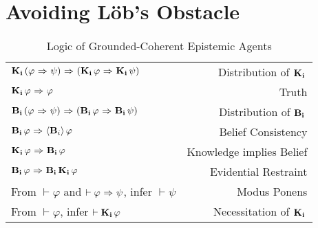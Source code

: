 \section{Avoiding L\"ob's Obstacle}
\label{sec:avoid_lob}

\begin{table}[H]
\begin{center}
	\begin{tabular}{| l r |}
		\hline
		$\mathbf{K}_{\mathbf{i}}\,(\varphi {\ \Rightarrow \ } \psi) {\ \Rightarrow \ } (\mathbf{K}_{\mathbf{i}}\,\varphi {\ \Rightarrow \ } \mathbf{K}_{\mathbf{i}}\,\psi)$ & Distribution of $\mathbf{K}_{\mathbf{i}}\,$ \\
		$\mathbf{K}_{\mathbf{i}}\,\varphi {\ \Rightarrow \ } \varphi$ & Truth \\
		$\mathbf{B}_{\mathbf{i}}\,(\varphi {\ \Rightarrow \ } \psi) {\ \Rightarrow \ } (\mathbf{B}_{\mathbf{i}}\,\varphi {\ \Rightarrow \ } \mathbf{B}_{\mathbf{i}}\,\psi)$ & Distribution of $\mathbf{B}_{\mathbf{i}}\,$\\
		$\mathbf{B}_{\mathbf{i}}\,\varphi {\ \Rightarrow \ } \langle \mathbf{B}_{i} \rangle\,\varphi$ & Belief Consistency \\
		$\mathbf{K}_{\mathbf{i}}\,\varphi {\ \Rightarrow \ } \mathbf{B}_{\mathbf{i}}\,\varphi$ & Knowledge implies Belief \\
		$\mathbf{B}_{\mathbf{i}}\,\varphi {\ \Rightarrow \ } \mathbf{B}_{\mathbf{i}}\,\mathbf{K}_{\mathbf{i}}\,\varphi$ & Evidential Restraint\\
		From $\vdash \varphi$ and $\vdash \varphi {\ \Rightarrow \ } \psi$, infer $\vdash\psi$ & Modus Ponens\\
		From $\vdash \varphi$, infer $\vdash \mathbf{K}_{\mathbf{i}}\,\varphi$ & Necessitation of $\mathbf{K}_{\mathbf{i}}\,$\\
		\hline
	\end{tabular}
	\caption{Logic of Grounded-Coherent Epistemic Agents}~\label{GC_agent}
\end{center}
\end{table}

